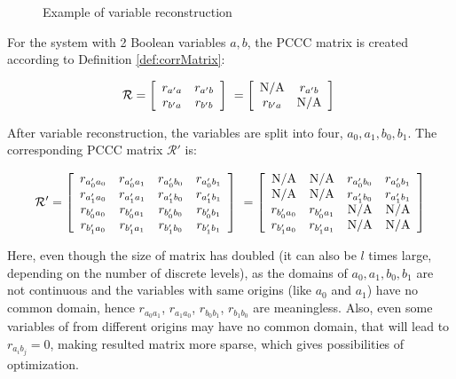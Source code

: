 \begin{figure}[ht]

\caption[Variable reconstruction]{Example of variable reconstruction}\label{varRec}
\end{figure}


For the system with 2 Boolean variables $a,b$, the PCCC matrix is created according to Definition \ref{def:corrMatrix}:


$$\mathcal{R}=\left[
\begin{array}{*{20}c}
r_{a'a} & r_{a'b}\\
r_{b'a} & r_{b'b} \\
\end{array}
\right]\ =\left[
\begin{array}{*{20}c}
{\rm N/A} & r_{a'b}\\
r_{b'a} & {\rm N/A} \\
\end{array}
\right]\ 
$$

After variable reconstruction, the variables are split into four, $a_0,a_1,b_0,b_1$.
The corresponding PCCC matrix $\mathcal{R}'$ is:

$$\mathcal{R}'=\left[
\begin{array}{*{20}c}
r_{a'_0a_0} & r_{a'_0a_1}& r_{a'_0b_0}&r_{a'_0b_1}\\
r_{a'_1a_0} & r_{a'_1a_1}& r_{a'_1b_0}&r_{a'_1b_1}\\
r_{b'_0a_0} & r_{b'_0a_1}& r_{b'_0b_0}&r_{b'_0b_1}\\
r_{b'_1a_0} & r_{b'_1a_1}& r_{b'_1b_0}&r_{b'_1b_1}\\
\end{array}
\right]\ =\left[\begin{array}{*{20}c}
{\rm N/A} & {\rm N/A}& r_{a'_0b_0}&r_{a'_0b_1}\\
{\rm N/A} & {\rm N/A}& r_{a'_1b_0}&r_{a'_1b_1}\\
r_{b'_0a_0} & r_{b'_0a_1}& {\rm N/A}&{\rm N/A}\\
r_{b'_1a_0} & r_{b'_1a_1}& {\rm N/A}&{\rm N/A}\\
\end{array}\right]$$

Here, even though the size of matrix has doubled (it can also be $l$ times large, depending on the number of discrete levels), as the domains of $a_0,a_1,b_0,b_1$ are not continuous and the variables with same origins (like $a_0$ and $a_1$) have no common domain, hence $r_{a_0a_1}$, $r_{a_1a_0}$, $r_{b_0b_1}$, $r_{b_1b_0}$ are meaningless. 
Also, even some variables of from different origins may have no common domain, that will lead to $r_{a_ib_j}=0$, making resulted matrix more sparse, which gives possibilities of optimization.

